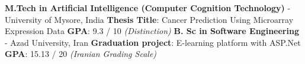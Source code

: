 %
%
%

\vspace{1em}

\begin{scholarship}

	{
		\textbf{M.Tech in Artificial Intelligence (Computer Cognition Technology)} - University of Mysore, India \newline
		\textbf{Thesis Title}: Cancer Prediction Using Microarray Expression Data \newline
		\textbf{GPA}: 9.3 / 10 \textit{(Distinction) }\newline
	}
	{
		\textbf{B. Sc in Software Engineering} - Azad University, Iran \newline
		\textbf{Graduation project}: E-learning platform with ASP.Net \newline
		\textbf{GPA}: 15.13 / 20 \textit{(Iranian Grading Scale)}  \newline
	}
\end{scholarship}